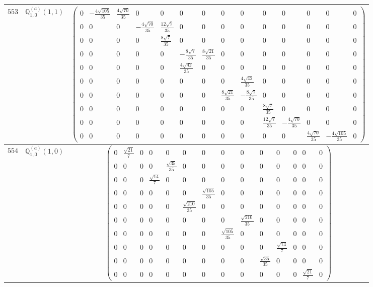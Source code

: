 \documentclass[fleqn,8pt,landscape]{jsarticle}
\begin{document}
\begin{center}
\begin{longtable}{ccc}
$ 553 $ & $ \mathbb{Q}_{1,0}^{(a)}(1,1) $ & $ \begin{pmatrix} 0 & - \frac{4 \sqrt{105}}{35} & \frac{4 \sqrt{70}}{35} & 0 & 0 & 0 & 0 & 0 & 0 & 0 & 0 & 0 & 0 & 0 \\ 0 & 0 & 0 & - \frac{4 \sqrt{70}}{35} & \frac{12 \sqrt{7}}{35} & 0 & 0 & 0 & 0 & 0 & 0 & 0 & 0 & 0 \\ 0 & 0 & 0 & 0 & \frac{8 \sqrt{7}}{35} & 0 & 0 & 0 & 0 & 0 & 0 & 0 & 0 & 0 \\ 0 & 0 & 0 & 0 & 0 & - \frac{8 \sqrt{7}}{35} & \frac{8 \sqrt{21}}{35} & 0 & 0 & 0 & 0 & 0 & 0 & 0 \\ 0 & 0 & 0 & 0 & 0 & \frac{4 \sqrt{42}}{35} & 0 & 0 & 0 & 0 & 0 & 0 & 0 & 0 \\ 0 & 0 & 0 & 0 & 0 & 0 & 0 & 0 & \frac{4 \sqrt{42}}{35} & 0 & 0 & 0 & 0 & 0 \\ 0 & 0 & 0 & 0 & 0 & 0 & 0 & \frac{8 \sqrt{21}}{35} & - \frac{8 \sqrt{7}}{35} & 0 & 0 & 0 & 0 & 0 \\ 0 & 0 & 0 & 0 & 0 & 0 & 0 & 0 & 0 & \frac{8 \sqrt{7}}{35} & 0 & 0 & 0 & 0 \\ 0 & 0 & 0 & 0 & 0 & 0 & 0 & 0 & 0 & \frac{12 \sqrt{7}}{35} & - \frac{4 \sqrt{70}}{35} & 0 & 0 & 0 \\ 0 & 0 & 0 & 0 & 0 & 0 & 0 & 0 & 0 & 0 & 0 & \frac{4 \sqrt{70}}{35} & - \frac{4 \sqrt{105}}{35} & 0 \end{pmatrix} $ \\ \hline
$ 554 $ & $ \mathbb{Q}_{1,0}^{(a)}(1,0) $ & $ \begin{pmatrix} 0 & \frac{\sqrt{21}}{7} & 0 & 0 & 0 & 0 & 0 & 0 & 0 & 0 & 0 & 0 & 0 & 0 \\ 0 & 0 & 0 & 0 & \frac{\sqrt{35}}{35} & 0 & 0 & 0 & 0 & 0 & 0 & 0 & 0 & 0 \\ 0 & 0 & 0 & \frac{\sqrt{14}}{7} & 0 & 0 & 0 & 0 & 0 & 0 & 0 & 0 & 0 & 0 \\ 0 & 0 & 0 & 0 & 0 & 0 & \frac{\sqrt{105}}{35} & 0 & 0 & 0 & 0 & 0 & 0 & 0 \\ 0 & 0 & 0 & 0 & 0 & \frac{\sqrt{210}}{35} & 0 & 0 & 0 & 0 & 0 & 0 & 0 & 0 \\ 0 & 0 & 0 & 0 & 0 & 0 & 0 & 0 & \frac{\sqrt{210}}{35} & 0 & 0 & 0 & 0 & 0 \\ 0 & 0 & 0 & 0 & 0 & 0 & 0 & \frac{\sqrt{105}}{35} & 0 & 0 & 0 & 0 & 0 & 0 \\ 0 & 0 & 0 & 0 & 0 & 0 & 0 & 0 & 0 & 0 & \frac{\sqrt{14}}{7} & 0 & 0 & 0 \\ 0 & 0 & 0 & 0 & 0 & 0 & 0 & 0 & 0 & \frac{\sqrt{35}}{35} & 0 & 0 & 0 & 0 \\ 0 & 0 & 0 & 0 & 0 & 0 & 0 & 0 & 0 & 0 & 0 & 0 & \frac{\sqrt{21}}{7} & 0 \end{pmatrix} $ \\ \hline

\end{longtable}
\end{center}
\end{document}
